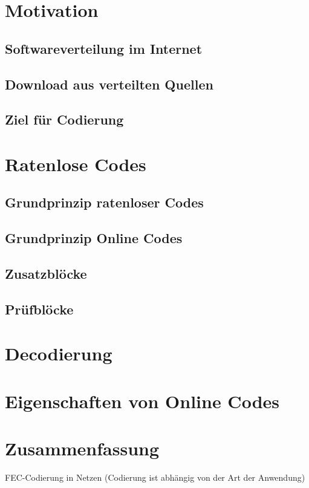 \section{Motivation}
\subsection{Softwareverteilung im Internet}
\subsection{Download aus verteilten Quellen}
\subsection{Ziel für Codierung}

\section{Ratenlose Codes}
\subsection{Grundprinzip ratenloser Codes}
\subsection{Grundprinzip Online Codes}
\subsection{Zusatzblöcke}
\subsection{Prüfblöcke}

\section{Decodierung}

\section{Eigenschaften von Online Codes}

\section{Zusammenfassung}
FEC-Codierung in Netzen (Codierung ist abhängig von der Art der Anwendung)
















